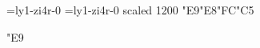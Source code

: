 
\font\x=ly1-zi4r-0 \font\y=ly1-zi4r-0 scaled 1200
\nopagenumbers \x
\char"E9\char"E8\char"FC\char"C5 \par
\y \char"E9 \pdfincludechars{}
\bye

